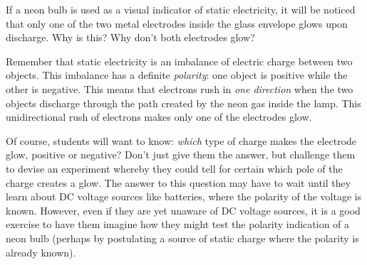 

If a neon bulb is used as a visual indicator of static electricity, it will be noticed that only one of the two metal electrodes inside the glass envelope glows upon discharge.  Why is this?  Why don't both electrodes glow?







Remember that static electricity is an imbalance of electric charge between two objects.  This imbalance has a definite {\it polarity}: one object is positive while the other is negative.  This means that electrons rush in {\it one direction} when the two objects discharge through the path created by the neon gas inside the lamp.  This unidirectional rush of electrons makes only one of the electrodes glow.







Of course, students will want to know: {\it which} type of charge makes the electrode glow, positive or negative?  Don't just give them the answer, but challenge them to devise an experiment whereby they could tell for certain which pole of the charge creates a glow.  The answer to this question may have to wait until they learn about DC voltage sources like batteries, where the polarity of the voltage is known.  However, even if they are yet unaware of DC voltage sources, it is a good exercise to have them imagine how they might test the polarity indication of a neon bulb (perhaps by postulating a source of static charge where the polarity is already known).




